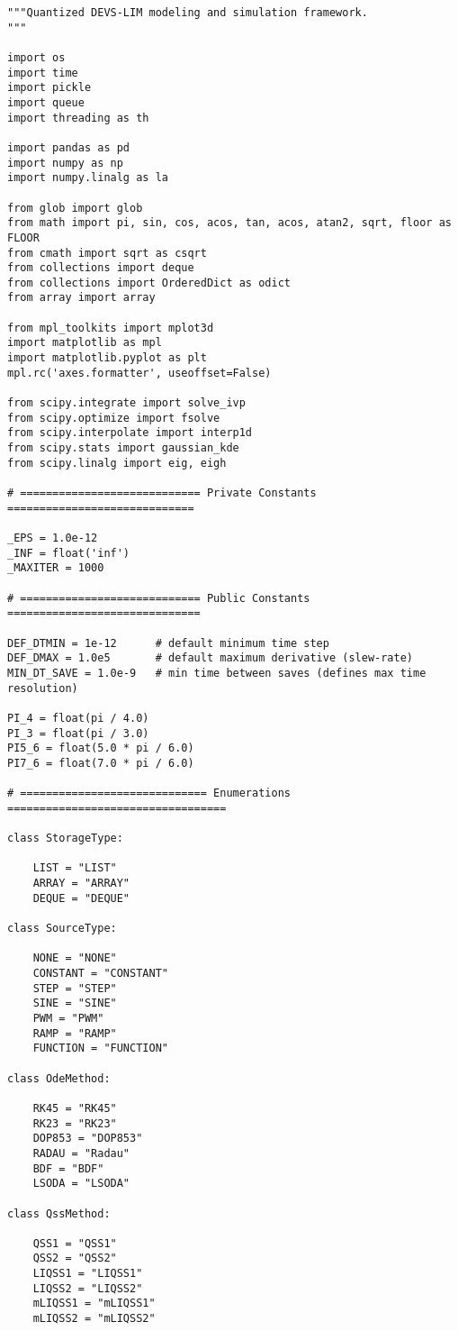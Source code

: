 

\begin{lstlisting}
"""Quantized DEVS-LIM modeling and simulation framework.
"""

import os
import time
import pickle
import queue
import threading as th

import pandas as pd
import numpy as np
import numpy.linalg as la

from glob import glob
from math import pi, sin, cos, acos, tan, acos, atan2, sqrt, floor as FLOOR
from cmath import sqrt as csqrt
from collections import deque
from collections import OrderedDict as odict
from array import array

from mpl_toolkits import mplot3d
import matplotlib as mpl
import matplotlib.pyplot as plt
mpl.rc('axes.formatter', useoffset=False)

from scipy.integrate import solve_ivp
from scipy.optimize import fsolve
from scipy.interpolate import interp1d
from scipy.stats import gaussian_kde
from scipy.linalg import eig, eigh

# ============================ Private Constants ============================= 

_EPS = 1.0e-12
_INF = float('inf')
_MAXITER = 1000

# ============================ Public Constants ============================== 

DEF_DTMIN = 1e-12      # default minimum time step
DEF_DMAX = 1.0e5       # default maximum derivative (slew-rate)
MIN_DT_SAVE = 1.0e-9   # min time between saves (defines max time resolution)

PI_4 = float(pi / 4.0)
PI_3 = float(pi / 3.0)
PI5_6 = float(5.0 * pi / 6.0)
PI7_6 = float(7.0 * pi / 6.0)

# ============================= Enumerations ================================== 

class StorageType:

    LIST = "LIST"
    ARRAY = "ARRAY"
    DEQUE = "DEQUE"

class SourceType:

    NONE = "NONE"
    CONSTANT = "CONSTANT"
    STEP = "STEP"
    SINE = "SINE"
    PWM = "PWM"
    RAMP = "RAMP"
    FUNCTION = "FUNCTION"

class OdeMethod:

    RK45 = "RK45"
    RK23 = "RK23"
    DOP853 = "DOP853"
    RADAU = "Radau"
    BDF = "BDF"
    LSODA = "LSODA"

class QssMethod:

    QSS1 = "QSS1"
    QSS2 = "QSS2"
    LIQSS1 = "LIQSS1"
    LIQSS2 = "LIQSS2"
    mLIQSS1 = "mLIQSS1"
    mLIQSS2 = "mLIQSS2"


\end{lstlisting}
